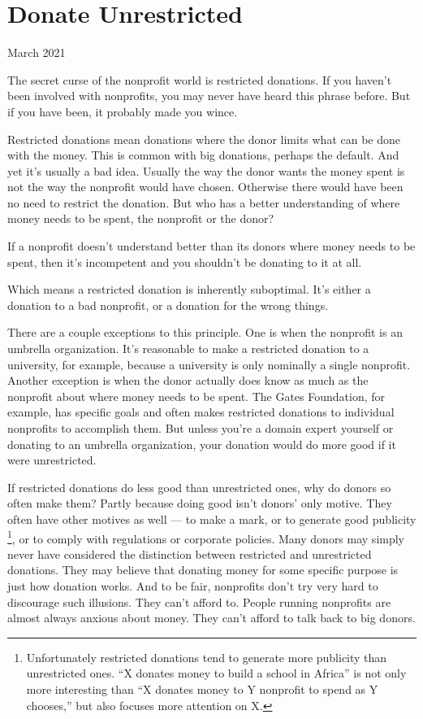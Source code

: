 \chapter{Donate Unrestricted}

March 2021

The secret curse of the nonprofit world is restricted donations. If you
haven't been involved with nonprofits, you may never have heard this
phrase before. But if you have been, it probably made you wince.

Restricted donations mean donations where the donor limits what can be
done with the money. This is common with big donations, perhaps the
default. And yet it's usually a bad idea. Usually the way the donor
wants the money spent is not the way the nonprofit would have chosen.
Otherwise there would have been no need to restrict the donation. But
who has a better understanding of where money needs to be spent, the
nonprofit or the donor?

If a nonprofit doesn't understand better than its donors where money
needs to be spent, then it's incompetent and you shouldn't be donating
to it at all.

Which means a restricted donation is inherently suboptimal. It's either
a donation to a bad nonprofit, or a donation for the wrong things.

There are a couple exceptions to this principle. One is when the
nonprofit is an umbrella organization. It's reasonable to make a
restricted donation to a university, for example, because a university
is only nominally a single nonprofit. Another exception is when the
donor actually does know as much as the nonprofit about where money
needs to be spent. The Gates Foundation, for example, has specific goals
and often makes restricted donations to individual nonprofits to
accomplish them. But unless you're a domain expert yourself or donating
to an umbrella organization, your donation would do more good if it were
unrestricted.

If restricted donations do less good than unrestricted ones, why do
donors so often make them? Partly because doing good isn't donors' only
motive. They often have other motives as well --- to make a mark, or to
generate good publicity \footnote{Unfortunately restricted donations tend to generate more
publicity than unrestricted ones. ``X donates money to build a school in
Africa'' is not only more interesting than ``X donates money to Y
nonprofit to spend as Y chooses,'' but also focuses more attention on X.}, or to comply with
regulations or corporate policies. Many donors may simply never have
considered the distinction between restricted and unrestricted
donations. They may believe that donating money for some specific
purpose is just how donation works. And to be fair, nonprofits don't try
very hard to discourage such illusions. They can't afford to. People
running nonprofits are almost always anxious about money. They can't
afford to talk back to big donors.


